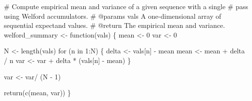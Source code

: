 \documentclass[
  letterpaper,
  DIV=11,
  numbers=noendperiod]{scrartcl}
\newenvironment{Shaded}{\begin{snugshade}}{\end{snugshade}}
\newcommand{\CommentTok}[1]{\textcolor[rgb]{0.37,0.37,0.37}{#1}}
\newcommand{\ControlFlowTok}[1]{\textcolor[rgb]{0.00,0.23,0.31}{#1}}
\newcommand{\DecValTok}[1]{\textcolor[rgb]{0.68,0.00,0.00}{#1}}
\newcommand{\KeywordTok}[1]{\textcolor[rgb]{0.00,0.23,0.31}{#1}}
\newcommand{\NormalTok}[1]{\textcolor[rgb]{0.00,0.23,0.31}{#1}}
\newcommand{\OperatorTok}[1]{\textcolor[rgb]{0.37,0.37,0.37}{#1}}
\begin{document}
\begin{Shaded}
\begin{Highlighting}[]
\CommentTok{\# Compute empirical mean and variance of a given sequence with a single}
\CommentTok{\# pass using Welford accumulators.}
\CommentTok{\# @params vals A one{-}dimensional array of sequential expectand values.}
\CommentTok{\# @return The empirical mean and variance.}
\NormalTok{welford\_summary }\OperatorTok{\textless{}{-}}\NormalTok{ function(vals) \{}
\NormalTok{  mean }\OperatorTok{\textless{}{-}} \DecValTok{0}
\NormalTok{  var }\OperatorTok{\textless{}{-}} \DecValTok{0}

\NormalTok{  N }\OperatorTok{\textless{}{-}}\NormalTok{ length(vals)}
  \ControlFlowTok{for}\NormalTok{ (n }\KeywordTok{in} \DecValTok{1}\NormalTok{:N) \{}
\NormalTok{    delta }\OperatorTok{\textless{}{-}}\NormalTok{ vals[n] }\OperatorTok{{-}}\NormalTok{ mean}
\NormalTok{    mean }\OperatorTok{\textless{}{-}}\NormalTok{ mean }\OperatorTok{+}\NormalTok{ delta }\OperatorTok{/}\NormalTok{ n}
\NormalTok{    var }\OperatorTok{\textless{}{-}}\NormalTok{ var }\OperatorTok{+}\NormalTok{ delta }\OperatorTok{*}\NormalTok{ (vals[n] }\OperatorTok{{-}}\NormalTok{ mean)}
\NormalTok{  \}}

\NormalTok{  var }\OperatorTok{\textless{}{-}}\NormalTok{ var}\OperatorTok{/}\NormalTok{ (N }\OperatorTok{{-}} \DecValTok{1}\NormalTok{)}

  \ControlFlowTok{return}\NormalTok{(c(mean, var))}
\NormalTok{\}}
\end{Highlighting}
\end{Shaded}
\end{document}
